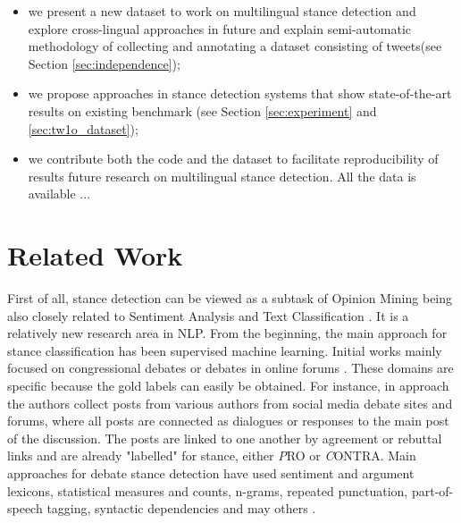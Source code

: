 \documentclass[10pt, a4paper]{article}
\begin{document}
\begin{itemize}
\item we present a new dataset to work on multilingual stance detection and explore cross-lingual approaches in future and explain semi-automatic methodology of collecting and annotating a dataset consisting of tweets(see Section \ref{sec:independence}); 

\item we propose approaches in stance detection systems that show state-of-the-art results on existing benchmark (see Section \ref{sec:experiment} and \ref{sec:tw1o_dataset}); 

\item we contribute both the code and the dataset to facilitate reproducibility of results future research on multilingual stance detection. All the data is available ...
\end{itemize}


\section{Related Work}
\label{sec_related_work}

First of all, stance detection can be viewed as a subtask of Opinion Mining being also closely related to Sentiment Analysis \cite{pang2008opinion} and Text Classification \cite{aggarwal2012survey}. It is a relatively new research area in NLP. From the beginning, the main approach for stance classification has been supervised machine learning. Initial works mainly focused on congressional debates \cite{Thomas06a} or debates in online forums \cite{somasundaran-wiebe-2009-recognizing,murakami-raymond-2010-support,Anand:2011:CRD:2107653.2107654,walker-etal-2012-stance,hasan-ng-2014-taking,sridhar-etal-2014-collective}. These domains are specific because the gold labels can easily be obtained. For instance, in \cite{sridhar-etal-2014-collective} approach the authors collect posts from various authors from social media debate sites and forums, where all posts are connected as dialogues or responses to the main post of the discussion. The posts are linked to one another by agreement or rebuttal links and are already "labelled" for stance, either {\emph PRO} or {\emph CONTRA}. Main approaches for debate stance detection have used sentiment and argument lexicons, statistical measures and counts, n-grams, repeated punctuation, part-of-speech tagging, syntactic dependencies and may others \cite{Wang8672602}.
\end{document}
